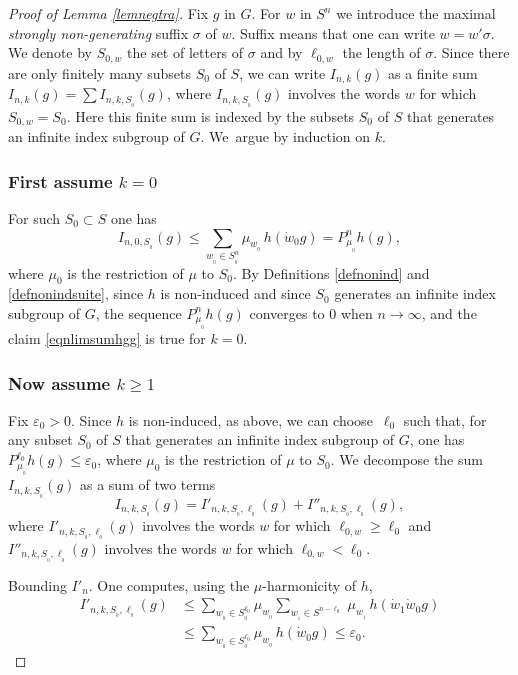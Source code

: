 \documentclass[11pt]{article}
\numberwithin{equation}{section}
\theoremstyle{definition}
\let\eps\varepsilon
\let\si\sigma
\let\ra\to
\begin{document}
\begin{proof}[Proof of Lemma \ref{lemnegtra}]
Fix $g$ in $G$. For $w$ in $S^n$ we introduce
the maximal \emph{strongly non-generating} suffix $\si$ of $w$.
Suffix means that one can write $w=w'\si$.
We denote by $S_{0,w}$ the set of letters of $\si$ and
by $\ell_{0,w}$ the length of $\si$.
Since there are only finitely many subsets $S_0$ of $S$,
we can write $I_{n,k}(g)$
as a finite sum $I_{n,k}(g)=\sum I_{n,k,S_{_0}}(g)$,
where $I_{n,k,S_{_0}}(g)$ involves the words $w$ for which $S_{0,w}=S_0$.
Here this finite sum is indexed by the subsets $S_0$ of $S$ that generates an infinite index subgroup of $G$.
We~argue by induction on $k$.

\subsubsection*{First assume $k=0$}
For such $S_0\subset S$
one has
\[
I_{n,0,S_{_0}}(g)\leq
\sum_{w_{_0}\in S_{_0}^{n}}\mu_{w_{_0}}\, h(\dot{w}_0g)
=
P_{\mu_{_0}}^nh(g),
\]
where $\mu_0$ is the
restriction of $\mu$ to $S_0$.
By Definitions \ref{defnonind} and \ref{defnonindsuite}, since $h$ is non-induced
and since $S_0$ generates an infinite index subgroup of $G$, the sequence
$P_{\mu_{_0}}^nh(g)$ converges to $0$ when $n\ra \infty$,
and the claim \eqref{eqnlimsumhgg} is true for $k=0$.

\subsubsection*{Now assume $k\geq 1$}
Fix $\eps_0>0$.
Since $h$ is non-induced, as above, we can choose~$\ell_0$ such that,
for any subset $S_0$ of $S$ that generates an infinite index subgroup of $G$,
one has $P_{\mu_{_0}}^{\ell_0}h(g)\leq \eps_0$, where $\mu_0$ is the
restriction of $\mu$ to $S_0$.
We decompose the sum $I_{n,k,S_{_0}}(g)$ as a sum of two terms
\[
I_{n,k,S_{_0}}(g)=
I'_{n,k,S_{_0},\ell_{_0}}(g)+I''_{n,k,S_{_0},\ell_{_0}}(g),
\]
where
$I'_{n,k,S_{_0},\ell_{_0}}(g)$ involves the words $w$ for which $\ell_{0,w}\geq \ell_0$ and
$I''_{n,k,S_{_0},\ell_{_0}}(g)$
involves the words $w$ for which $\ell_{0,w}< \ell_0$.

Bounding $I'_n$. One computes, using the $\mu$-harmonicity of $h$,
\begin{align*}
I'_{n,k,S_{_0},\ell_{_0}}(g)&\leq
\sum_{w_{_0}\in S_{_0}^{\ell_0}}\mu_{w_{_0}}
\sum_{w_{_1}\in S^{n\!-\!\ell_0}}\,
\mu_{w_{_1}}\, h(\dot{w}_{1}\dot{w}_0g)\\
&\leq
\sum_{w_{_0}\in S_{_0}^{\ell_0}}\mu_{w_{_0}}\, h(\dot{w}_0g)\leq \eps_0.
\end{align*}


\end{proof}
\end{document}
